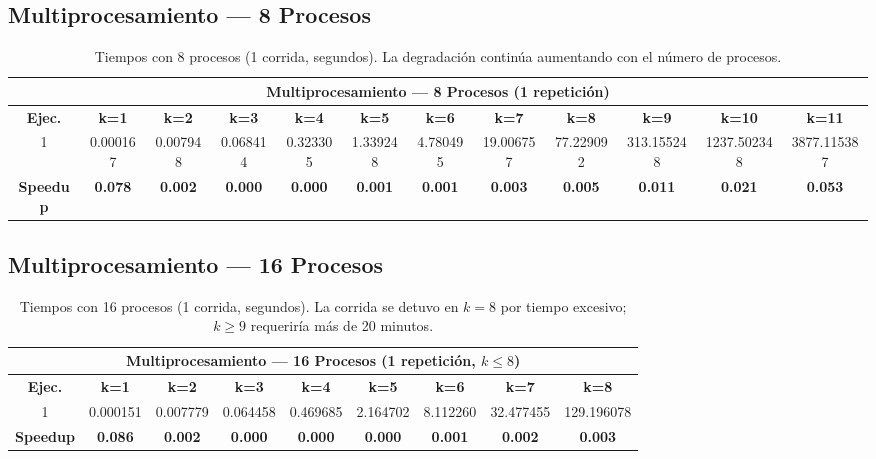 \documentclass{article}
\begin{document}
\subsection{Multiprocesamiento --- 8 Procesos}

\begin{table}[H]
\centering
\tiny
\begin{tabular}{|c|c|c|c|c|c|c|c|c|c|c|c|}
\hline
\multicolumn{12}{|c|}{\textbf{Multiprocesamiento --- 8 Procesos (1 repetición)}} \\
\hline
\textbf{Ejec.} & \textbf{k=1} & \textbf{k=2} & \textbf{k=3} & \textbf{k=4} & \textbf{k=5} & \textbf{k=6} & \textbf{k=7} & \textbf{k=8} & \textbf{k=9} & \textbf{k=10} & \textbf{k=11} \\
\hline
1 & 0.000167 & 0.007948 & 0.068414 & 0.323305 & 1.339248 & 4.780495 & 19.006757 & 77.229092 & 313.155248 & 1237.502348 & 3877.115387 \\
\hline
\textbf{Speedup} & \textbf{0.078} & \textbf{0.002} & \textbf{0.000} & \textbf{0.000} & \textbf{0.001} & \textbf{0.001} & \textbf{0.003} & \textbf{0.005} & \textbf{0.011} & \textbf{0.021} & \textbf{0.053} \\
\hline
\end{tabular}
\caption{Tiempos con 8 procesos (1 corrida, segundos). La degradación continúa aumentando con el número de procesos.}
\label{tab:mp8}
\end{table}

\subsection{Multiprocesamiento --- 16 Procesos}

\begin{table}[H]
\centering
\tiny
\begin{tabular}{|c|c|c|c|c|c|c|c|c|}
\hline
\multicolumn{9}{|c|}{\textbf{Multiprocesamiento --- 16 Procesos (1 repetición, $k \leq 8$)}} \\
\hline
\textbf{Ejec.} & \textbf{k=1} & \textbf{k=2} & \textbf{k=3} & \textbf{k=4} & \textbf{k=5} & \textbf{k=6} & \textbf{k=7} & \textbf{k=8} \\
\hline
1 & 0.000151 & 0.007779 & 0.064458 & 0.469685 & 2.164702 & 8.112260 & 32.477455 & 129.196078 \\
\hline
\textbf{Speedup} & \textbf{0.086} & \textbf{0.002} & \textbf{0.000} & \textbf{0.000} & \textbf{0.000} & \textbf{0.001} & \textbf{0.002} & \textbf{0.003} \\
\hline
\end{tabular}
\caption{Tiempos con 16 procesos (1 corrida, segundos). La corrida se detuvo en $k=8$ por tiempo excesivo; $k \geq 9$ requeriría más de 20 minutos.}
\label{tab:mp16}
\end{table}
\end{document}
